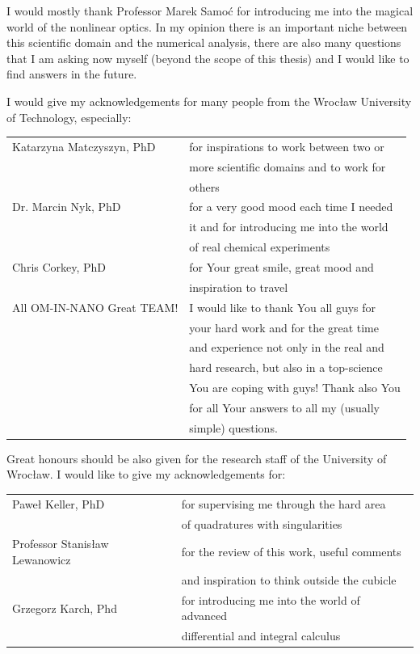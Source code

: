 \documentclass[12pt,twoside,a4paper]{article}
\numberwithin{equation}{subsection}
\numberwithin{figure}{subsection}
\begin{document}
I would mostly thank Professor Marek Samoć for introducing me into the magical world of the nonlinear optics. In my opinion there
is an important niche between this scientific domain and the numerical analysis, there are also many questions that I am asking now
myself (beyond the scope of this thesis) and I would like to find answers in the future.


I would give my acknowledgements for many people from the Wrocław University of Technology, especially:


\begin{tabular}{l l}
	Katarzyna Matczyszyn, PhD  & for inspirations to work between two or \\
	                           & more scientific domains and to work for \\ 
	                           & others \\ 
	Dr. Marcin Nyk, PhD        & for a very good mood each time I needed \\
	                           & it and for introducing me into the world \\
	                           & of real chemical experiments \\
	Chris Corkey, PhD          & for Your great smile, great mood and \\
	                           & inspiration to travel \\
	All OM-IN-NANO Great TEAM! & I would like to thank You all guys for \\ 
	                           & your hard work and for the great time \\
	                           & and experience not only in the real and \\
	                           & hard research, but also in a top-science \\
	                           & You are coping with guys! Thank also You \\
	                           & for all Your answers to all my (usually \\
	                           & simple) questions. \\
\end{tabular}


Great honours should be also given for the research staff of the University of Wrocław. I would like to give my acknowledgements for:


\begin{tabular}{l l}
    Paweł Keller, PhD              & for supervising me through the hard area \\
                                   & of quadratures with singularities \\ 
    Professor Stanisław Lewanowicz & for the review of this work, useful comments \\
    							   & and inspiration to think outside the cubicle \\
    Grzegorz Karch, Phd            & for introducing me into the world of advanced \\
                                   & differential and integral calculus \\
\end{tabular}
\end{document}
